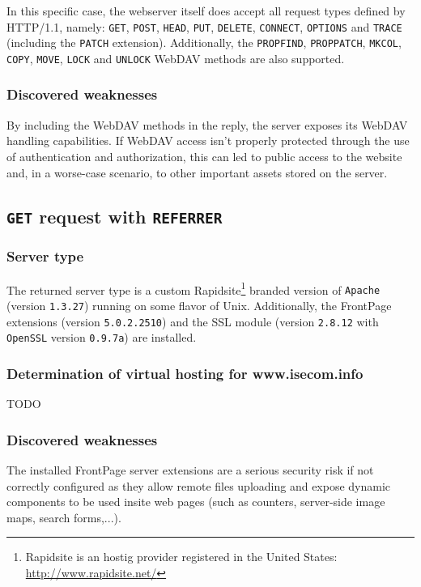 In this specific case, the webserver itself does accept all request types defined by HTTP/1.1, namely: {\tt GET}, {\tt POST}, {\tt HEAD}, {\tt PUT}, {\tt DELETE}, {\tt CONNECT}, {\tt OPTIONS} and {\tt TRACE} (including the {\tt PATCH} extension). Additionally, the {\tt PROPFIND}, {\tt PROPPATCH}, {\tt MKCOL}, {\tt COPY}, {\tt MOVE}, {\tt LOCK} and {\tt UNLOCK} WebDAV methods are also supported.

\subsubsection{Discovered weaknesses}

By including the WebDAV methods in the reply, the server exposes its WebDAV handling capabilities. If WebDAV access isn't properly protected through the use of authentication and authorization, this can led to public access to the website and, in a worse-case scenario, to other important assets stored on the server.



\subsection{\texttt{GET} request with \texttt{REFERRER}}

\subsubsection{Server type}

The returned server type is a custom Rapidsite\footnote{Rapidsite is an hostig provider registered in the United States: \url{http://www.rapidsite.net/}} branded version of {\tt Apache} (version {\tt 1.3.27}) running on some flavor of Unix. Additionally, the FrontPage extensions (version {\tt 5.0.2.2510}) and the SSL module (version {\tt 2.8.12} with {\tt OpenSSL} version {\tt 0.9.7a}) are installed.

\subsubsection{Determination of virtual hosting for www.isecom.info}
TODO

\subsubsection{Discovered weaknesses}

The installed FrontPage server extensions are a serious security risk if not correctly configured as they allow remote files uploading and expose dynamic components to be used insite web pages (such as counters, server-side image maps, search forms,...).

